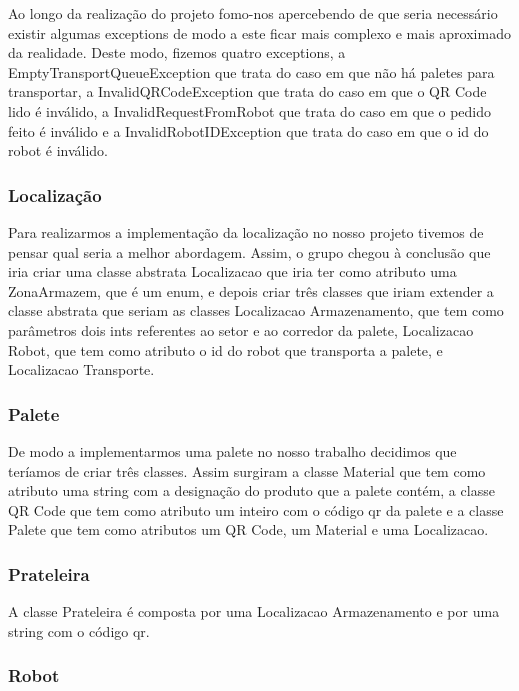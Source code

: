 \documentclass[11pt]{article}
\begin{document}
Ao longo da realização do projeto fomo-nos apercebendo de que seria necessário existir algumas exceptions de modo a este ficar mais complexo e mais aproximado da realidade. Deste modo, fizemos quatro exceptions, a EmptyTransportQueueException que trata do caso em que não há paletes para transportar, a InvalidQRCodeException que trata do caso em que o QR Code lido é inválido, a InvalidRequestFromRobot que trata do caso em que o pedido feito é inválido e a InvalidRobotIDException que trata do caso em que o id do robot é inválido.

\subsubsection{Localização}

Para realizarmos a implementação da localização no nosso projeto tivemos de pensar qual seria a melhor abordagem. Assim, o grupo chegou à conclusão que iria criar uma classe abstrata Localizacao que iria ter como atributo uma ZonaArmazem, que é um enum, e depois criar três classes que iriam extender a classe abstrata que seriam as classes Localizacao Armazenamento, que tem como parâmetros dois ints referentes ao setor e ao corredor da palete, Localizacao Robot, que tem como atributo o id do robot que transporta a palete, e Localizacao Transporte.

\subsubsection{Palete}

De modo a implementarmos uma palete no nosso trabalho decidimos que teríamos de criar três classes. Assim surgiram a classe Material que tem como atributo uma string com a designação do produto que a palete contém, a classe QR Code que tem como atributo um inteiro com o código qr da palete e a classe Palete que tem como atributos um QR Code, um Material e uma Localizacao.

\subsubsection{Prateleira}

A classe Prateleira é composta por uma Localizacao Armazenamento e por uma string com o código qr.

\subsubsection{Robot}
\end{document}
